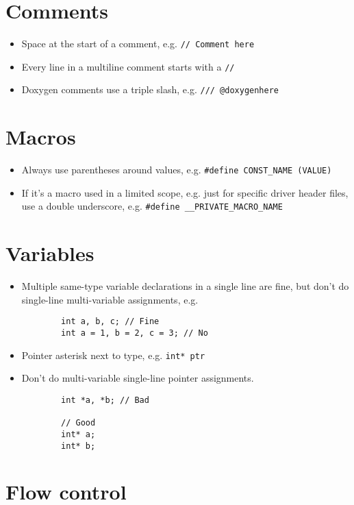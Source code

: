 \documentclass{article}
\begin{document}
\section{Comments}

\begin{itemize}
	\item Space at the start of a comment, e.g. \lstinline{// Comment here}
	\item Every line in a multiline comment starts with a \lstinline{//}
	\item Doxygen comments use a triple slash, e.g. \lstinline{/// @doxygenhere}
\end{itemize}

\section{Macros}

\begin{itemize}
	\item Always use parentheses around values, e.g. \lstinline{#define CONST_NAME (VALUE)}
	\item If it's a macro used in a limited scope, e.g. just for specific driver header files, use a double underscore, e.g. \lstinline{#define __PRIVATE_MACRO_NAME} 
\end{itemize}

\section{Variables}

\begin{itemize}
	\item Multiple same-type variable declarations in a single line are fine, but don't do single-line multi-variable assignments, e.g.
	\begin{lstlisting}
		int a, b, c; // Fine
		int a = 1, b = 2, c = 3; // No
	\end{lstlisting}

	\item Pointer asterisk next to type, e.g. \lstinline{int* ptr}
	\item Don't do multi-variable single-line pointer assignments.
	\begin{lstlisting}
		int *a, *b; // Bad

		// Good
		int* a;
		int* b;
	\end{lstlisting}
\end{itemize}

\section{Flow control}
\end{document}
